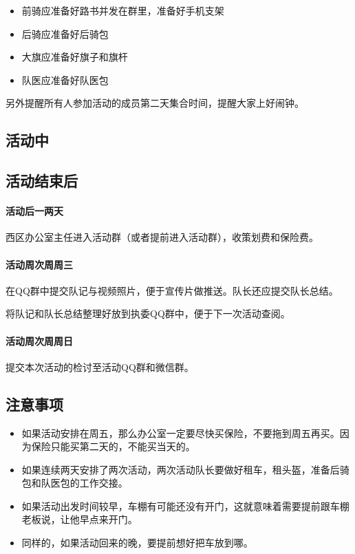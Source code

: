 \documentclass{ctexbook}
\begin{document}
\begin{itemize}
    \item 前骑应准备好路书并发在群里，准备好手机支架
    \item 后骑应准备好后骑包
    \item 大旗应准备好旗子和旗杆
    \item 队医应准备好队医包
\end{itemize}

另外提醒所有人参加活动的成员第二天集合时间，提醒大家上好闹钟。
\subsection{活动中}
\subsection{活动结束后}
\paragraph{活动后一两天}
西区办公室主任进入活动群（或者提前进入活动群），收策划费和保险费。
\paragraph{活动周次周周三}

在QQ群中提交队记与视频照片，便于宣传片做推送。队长还应提交队长总结。

将队记和队长总结整理好放到执委QQ群中，便于下一次活动查阅。

\paragraph{活动周次周周日}

提交本次活动的检讨至活动QQ群和微信群。
\subsection{注意事项}
    \begin{itemize}
        \item 如果活动安排在周五，那么办公室一定要尽快买保险，不要拖到周五再买。因为保险只能买第二天的，不能买当天的。
        \item 如果连续两天安排了两次活动，两次活动队长要做好租车，租头盔，准备后骑包和队医包的工作交接。
        \item 如果活动出发时间较早，车棚有可能还没有开门，这就意味着需要提前跟车棚老板说，让他早点来开门。
        \item 同样的，如果活动回来的晚，要提前想好把车放到哪。
    \end{itemize}
\end{document}
